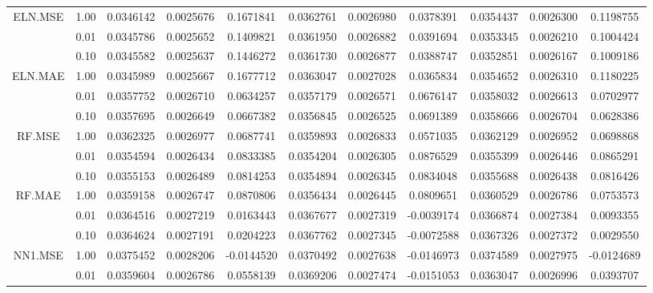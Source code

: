 \begin{longtable}[t]{ccccccccccc}
\cmidrule{2-11}
\multirow{-3}{*}{\centering\arraybackslash ELN.MSE} & 1.00 & 0.0346142 & 0.0025676 & 0.1671841 & 0.0362761 & 0.0026980 & 0.0378391 & 0.0354437 & 0.0026300 & 0.1198755\\
\cmidrule{1-11}
 & 0.01 & 0.0345786 & 0.0025652 & 0.1409821 & 0.0361950 & 0.0026882 & 0.0391694 & 0.0353345 & 0.0026210 & 0.1004424\\
\cmidrule{2-11}
 & 0.10 & 0.0345582 & 0.0025637 & 0.1446272 & 0.0361730 & 0.0026877 & 0.0388747 & 0.0352851 & 0.0026167 & 0.1009186\\
\cmidrule{2-11}
\multirow{-3}{*}{\centering\arraybackslash ELN.MAE} & 1.00 & 0.0345989 & 0.0025667 & 0.1677712 & 0.0363047 & 0.0027028 & 0.0365834 & 0.0354652 & 0.0026310 & 0.1180225\\
\cmidrule{1-11}
 & 0.01 & 0.0357752 & 0.0026710 & 0.0634257 & 0.0357179 & 0.0026571 & 0.0676147 & 0.0358032 & 0.0026613 & 0.0702977\\
\cmidrule{2-11}
 & 0.10 & 0.0357695 & 0.0026649 & 0.0667382 & 0.0356845 & 0.0026525 & 0.0691389 & 0.0358666 & 0.0026704 & 0.0628386\\
\cmidrule{2-11}
\multirow{-3}{*}{\centering\arraybackslash RF.MSE} & 1.00 & 0.0362325 & 0.0026977 & 0.0687741 & 0.0359893 & 0.0026833 & 0.0571035 & 0.0362129 & 0.0026952 & 0.0698868\\
\cmidrule{1-11}
 & 0.01 & 0.0354594 & 0.0026434 & 0.0833385 & 0.0354204 & 0.0026305 & 0.0876529 & 0.0355399 & 0.0026446 & 0.0865291\\
\cmidrule{2-11}
 & 0.10 & 0.0355153 & 0.0026489 & 0.0814253 & 0.0354894 & 0.0026345 & 0.0834048 & 0.0355688 & 0.0026438 & 0.0816426\\
\cmidrule{2-11}
\multirow{-3}{*}{\centering\arraybackslash RF.MAE} & 1.00 & 0.0359158 & 0.0026747 & 0.0870806 & 0.0356434 & 0.0026445 & 0.0809651 & 0.0360529 & 0.0026786 & 0.0753573\\
\cmidrule{1-11}
 & 0.01 & 0.0364516 & 0.0027219 & 0.0163443 & 0.0367677 & 0.0027319 & -0.0039174 & 0.0366874 & 0.0027384 & 0.0093355\\
\cmidrule{2-11}
 & 0.10 & 0.0364624 & 0.0027191 & 0.0204223 & 0.0367762 & 0.0027345 & -0.0072588 & 0.0367326 & 0.0027372 & 0.0029550\\
\cmidrule{2-11}
\multirow{-3}{*}{\centering\arraybackslash NN1.MSE} & 1.00 & 0.0375452 & 0.0028206 & -0.0144520 & 0.0370492 & 0.0027638 & -0.0146973 & 0.0374589 & 0.0027975 & -0.0124689\\
\cmidrule{1-11}
 & 0.01 & 0.0359604 & 0.0026786 & 0.0558139 & 0.0369206 & 0.0027474 & -0.0151053 & 0.0363047 & 0.0026996 & 0.0393707\\

\end{longtable}
